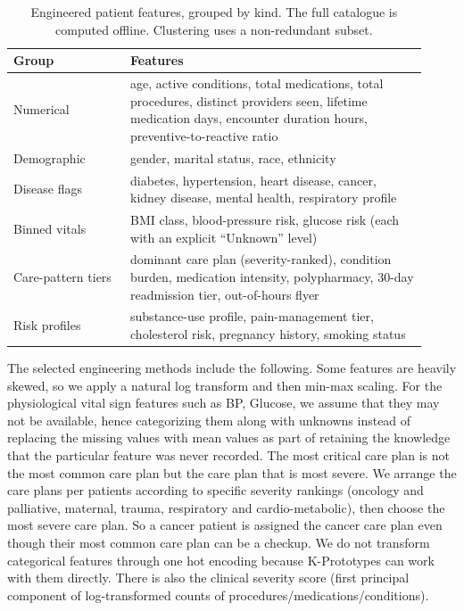 \begin{table}[t]
\caption{Engineered patient features, grouped by kind. The full catalogue is computed offline. Clustering uses a non-redundant subset.}
\label{tab:features}
\centering
\footnotesize
\begin{tabular}{@{}p{0.26\linewidth}p{0.66\linewidth}@{}}
\toprule
Group & Features \\
\midrule
Numerical & age, active conditions, total medications, total procedures, distinct providers seen, lifetime medication days, encounter duration hours, preventive-to-reactive ratio \\[2pt]
Demographic & gender, marital status, race, ethnicity \\[2pt]
Disease flags & diabetes, hypertension, heart disease, cancer, kidney disease, mental health, respiratory profile \\[2pt]
Binned vitals & BMI class, blood-pressure risk, glucose risk (each with an explicit ``Unknown'' level) \\[2pt]
Care-pattern tiers & dominant care plan (severity-ranked), condition burden, medication intensity, polypharmacy, 30-day readmission tier, out-of-hours flyer \\[2pt]
Risk profiles & substance-use profile, pain-management tier, cholesterol risk, pregnancy history, smoking status \\
\bottomrule
\end{tabular}
\end{table}

The selected engineering methods include the following. Some features are heavily skewed, so we apply a natural log transform and then min-max scaling. For the physiological vital sign features such as BP, Glucose, we assume that they may not be available, hence categorizing them along with unknowns instead of replacing the missing values with mean values as part of retaining the knowledge that the particular feature was never recorded. The most critical care plan is not the most common care plan but the care plan that is most severe. We arrange the care plans per patients according to specific severity rankings (oncology and palliative, maternal, trauma, respiratory and cardio-metabolic), then choose the most severe care plan. So a cancer patient is assigned the cancer care plan even though their most common care plan can be a checkup. We do not transform categorical features through one hot encoding because K-Prototypes can work with them directly. There is also the clinical severity score (first principal component of log-transformed counts of procedures/medications/conditions).

